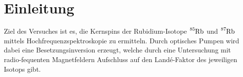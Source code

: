 \section{Einleitung}
\label{sec:einleitung}
Ziel des Versuches ist es, die Kernspins der Rubidium-Isotope
$\ce{^{85}Rb}$ und $\ce{^{87}Rb}$ mittels Hochfrequenzspektroskopie
zu ermitteln. Durch optisches Pumpen wird dabei eine Besetzungsinversion
erzeugt, welche durch eine Untersuchung mit radio-fequenten Magnetfeldern
Aufschluss auf den Landé-Faktor des jeweiligen Isotops gibt. 